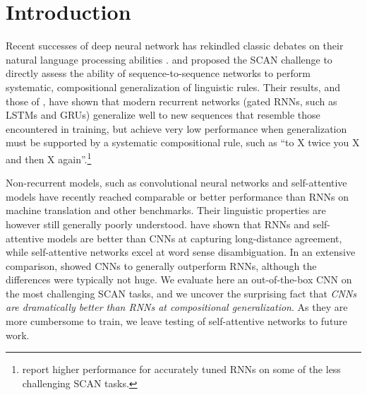 \section{Introduction}
\label{sec:intro}

Recent successes of deep neural network has rekindled classic
debates on their natural language processing abilities
\cite[e.g.,][]{Kirov:Cotterell:2018,McCoy:etal:2018,Pater:2018}. \citet{Lake:Baroni:2017}
and \citet{Loula:etal:2018} proposed the SCAN challenge to
directly assess the ability of sequence-to-sequence networks to
perform systematic, compositional generalization of linguistic
rules. Their results, and those of \citet{Bastings:etal:2018}, have
shown that modern recurrent networks (gated RNNs, such as LSTMs and GRUs) generalize well
to new sequences that resemble those encountered in training,
but achieve very low performance when generalization must be
supported by a systematic compositional rule, such as ``to X twice
you X and then X again''.\footnote{\citet{Bastings:etal:2018}
  report higher performance for accurately tuned RNNs on
  some of the less challenging SCAN tasks.}

Non-recurrent models, such as convolutional neural networks
\cite[CNNs,][]{kalchbrenner:etal:2016, gehring:etal:2016,
  gehring:etal:2017} and self-attentive models
\cite{vaswani:etal:2017, chen:etal:2018} have recently reached
comparable or better performance than RNNs on machine translation and
other benchmarks. Their linguistic properties are however still
generally poorly understood.  have shown that
RNNs and self-attentive models are better than CNNs at capturing
long-distance agreement, while self-attentive networks excel at word
sense disambiguation. In an extensive comparison,
 showed CNNs to generally outperform RNNs,
although the differences were typically not huge. We evaluate here an out-of-the-box CNN on the most
challenging SCAN tasks, and we uncover the surprising fact that
\emph{CNNs are dramatically better than RNNs at compositional
  generalization}. As they are more cumbersome to train, we leave
testing of self-attentive networks to future work.




